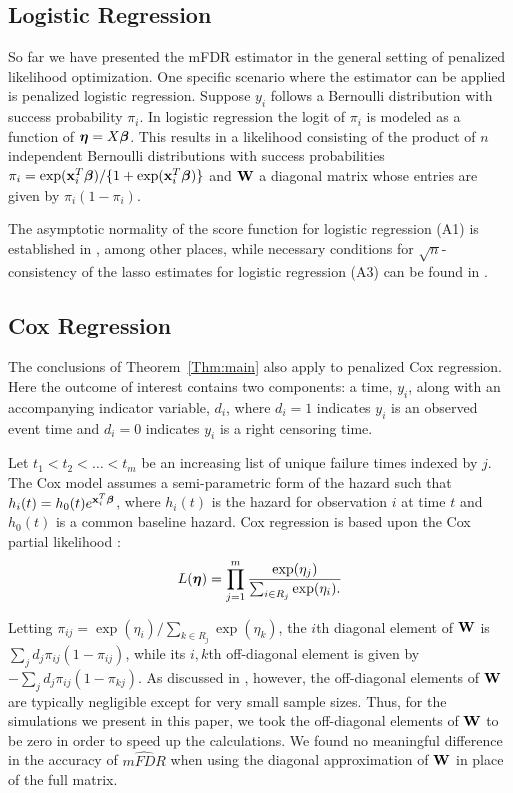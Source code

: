 \subsection{Logistic Regression}

So far we have presented the mFDR estimator in the general setting of penalized likelihood optimization. One specific scenario where the estimator can be applied is penalized logistic regression. Suppose $y_i$ follows a Bernoulli distribution with success probability $\pi_i$. In logistic regression the logit of $\pi_i$ is modeled as a function of $\boldsymbol{\eta} = X\boldsymbol{\beta}$.  This results in a likelihood consisting of the product of $n$ independent Bernoulli distributions with success probabilities $\pi_i = \exp(\mathbf{x}_i^T\boldsymbol{\beta})/\{1 + \exp(\mathbf{x}_i^T\boldsymbol{\beta})\}$ and $\mathbf{W}$ a diagonal matrix whose entries are given by $\pi_i(1-\pi_i)$.

The asymptotic normality of the score function for logistic regression (A1) is established in \citet{McCullagh1989}, among other places, while necessary conditions for $\sqrt{n}$-consistency of the lasso estimates for logistic regression (A3) can be found in \citet{SCAD}.

\subsection{Cox Regression}

The conclusions of Theorem~\ref{Thm:main} also apply to penalized Cox regression. Here the outcome of interest contains two components: a time, $y_i$, along with an accompanying indicator variable, $d_i$, where $d_i = 1$ indicates $y_i$ is an observed event time and $d_i = 0$ indicates $y_i$ is a right censoring time.

Let $t_1 < t_2 < \ldots < t_m$ be an increasing list of unique failure times indexed by $j$. The Cox model assumes a semi-parametric form of the hazard such that $h_i(t) = h_0(t)e^{\mathbf{x}_i^T \boldsymbol{\beta}}$, where $h_i(t)$ is the hazard for observation $i$ at time $t$ and $h_0(t)$ is a common baseline hazard. Cox regression is based upon the Cox partial likelihood \citep{Cox1972}:
\begin{equation*}
L(\boldsymbol{\eta})  = \prod_{j=1}^{m} \frac{\exp(\eta_j)}{\sum_{i \in R_j} \exp(\eta_i).} 
\end{equation*}

Letting $\pi_{ij} = \exp(\eta_i)/\sum_{k \in R_j}\exp(\eta_k)$, the $i$th diagonal element of $\mathbf{W}$ is $\sum_j d_j\pi_{ij}(1-\pi_{ij})$, while its $i,k$th off-diagonal element is given by $-\sum_j d_j\pi_{ij}(1-\pi_{kj})$.  As discussed in \citet{Simon2011}, however, the off-diagonal elements of $\mathbf{W}$ are typically negligible except for very small sample sizes.  Thus, for the simulations we present in this paper, we took the off-diagonal elements of $\mathbf{W}$ to be zero in order to speed up the calculations.  We found no meaningful difference in the accuracy of $\widehat{mFDR}$ when using the diagonal approximation of $\mathbf{W}$ in place of the full matrix.

